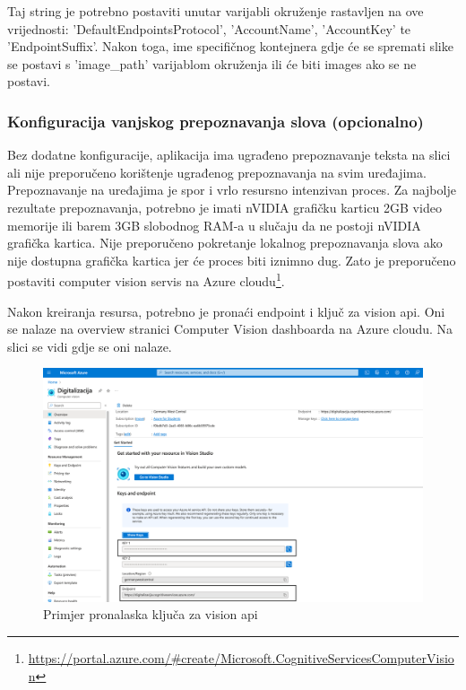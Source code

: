 			{Taj string je potrebno postaviti unutar varijabli okruženje rastavljen na ove vrijednosti: 'DefaultEndpointsProtocol', 'AccountName', 'AccountKey' te 'EndpointSuffix'. Nakon toga, ime specifičnog kontejnera gdje će se spremati slike se postavi s 'image\_path' varijablom okruženja ili će biti images ako se ne postavi.}
			
			\subsubsection{Konfiguracija vanjskog prepoznavanja slova (opcionalno)}
			
			{Bez dodatne konfiguracije, aplikacija ima ugrađeno prepoznavanje teksta na slici ali nije preporučeno korištenje ugrađenog prepoznavanja na svim uređajima. Prepoznavanje na uređajima je spor i vrlo resursno intenzivan proces. Za najbolje rezultate prepoznavanja, potrebno je imati nVIDIA grafičku karticu 2GB video memorije ili barem 3GB slobodnog RAM-a u slučaju da ne postoji nVIDIA grafička kartica. Nije preporučeno pokretanje lokalnog prepoznavanja slova ako nije dostupna grafička kartica jer će proces biti iznimno dug. Zato je preporučeno postaviti computer vision servis na Azure cloudu\footnote{\url{https://portal.azure.com/\#create/Microsoft.CognitiveServicesComputerVision}}.}
			
			{Nakon kreiranja resursa, potrebno je pronaći endpoint i ključ za vision api. Oni se nalaze na overview stranici Computer Vision dashboarda na Azure cloudu. Na slici se vidi gdje se oni nalaze.}
			
			\begin{figure}[H]
				\includegraphics[width=\textwidth]{slike/visionApiKey.png}
				\caption{Primjer pronalaska ključa za vision api}
				\label{fig:visionApiKey}
			\end{figure}
			
